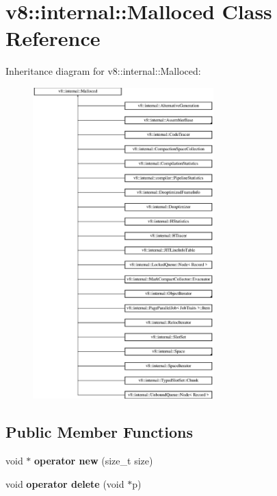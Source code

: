 \hypertarget{classv8_1_1internal_1_1_malloced}{}\section{v8\+:\+:internal\+:\+:Malloced Class Reference}
\label{classv8_1_1internal_1_1_malloced}
Inheritance diagram for v8\+:\+:internal\+:\+:Malloced\+:\begin{figure}[H]
\begin{center}
\leavevmode
\includegraphics[height=12.000000cm]{classv8_1_1internal_1_1_malloced}
\end{center}
\end{figure}
\subsection*{Public Member Functions}
\begin{DoxyCompactItemize}
\item 
void $\ast$ {\bfseries operator new} (size\+\_\+t size)\hypertarget{classv8_1_1internal_1_1_malloced_a7dca7aef948362361f6b2e38962472e3}{}\label{classv8_1_1internal_1_1_malloced_a7dca7aef948362361f6b2e38962472e3}

\item 
void {\bfseries operator delete} (void $\ast$p)\hypertarget{classv8_1_1internal_1_1_malloced_ab53b7aaa07615d36caa3edc49bfc6019}{}\label{classv8_1_1internal_1_1_malloced_ab53b7aaa07615d36caa3edc49bfc6019}

\end{DoxyCompactItemize}
